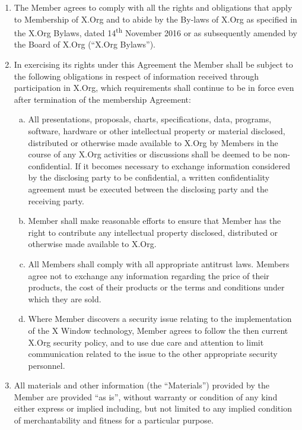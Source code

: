 \documentclass[10pt, english]{xorgdocs}
\newcommand\nth{\textsuperscript{th}\xspace} %
\begin{document}
\begin{enumerate}[(1)\hspace{.2cm}]
	\item The Member agrees to comply with all the rights and obligations
	that apply to Membership of X.Org and to abide by the By-laws of X.Org
	as specified in the X.Org Bylaws, dated 14\nth November 2016 or as
	subsequently amended by the Board of X.Org (``X.Org Bylaws'').

	\item In exercising its rights under this Agreement the Member shall be
	subject to the following obligations in respect of information received
	through participation in X.Org, which requirements shall continue to be
	in force even after termination of the membership Agreement:

	\begin{enumerate}[(a)\hspace{.2cm}]
		\item All presentations, proposals, charts, specifications,
		data, programs, software, hardware or other intellectual
		property or material disclosed, distributed or otherwise made
		available to X.Org by Members in the course of any X.Org
		activities or discussions shall be deemed to be non-confidential.
		If it becomes necessary to exchange information considered by
		the disclosing party to be confidential, a written
		confidentiality agreement must be executed between the
		disclosing party and the receiving party.

		\item Member shall make reasonable efforts to ensure that
		Member has the right to contribute any intellectual property
		disclosed, distributed or otherwise made available to X.Org.

		\item All Members shall comply with all appropriate antitrust
		laws. Members agree not to exchange any information regarding
		the price of their products, the cost of their products or
		the terms and conditions under which they are sold.

		\item Where Member discovers a security issue relating to the
		implementation of the X Window technology, Member agrees to
		follow the then current X.Org security policy, and to use due
		care and attention to limit communication related to the issue
		to the other appropriate security personnel.
	\end{enumerate}

	\item All materials and other information (the ``Materials'') provided
	by the Member are provided ``as is'', without warranty or condition of
	any kind either express or implied including, but not limited to any
	implied condition of merchantability and fitness for a particular
	purpose.


\end{enumerate}
\end{document}
